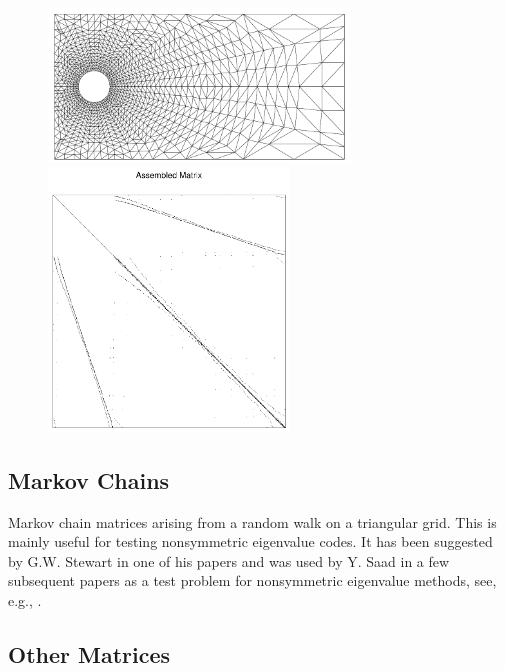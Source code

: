 \documentclass[12pt]{article}
\begin{document}
\newpage

\begin{figure}
\begin{minipage}[h]{6.5cm}
\includegraphics[width=8cm]{msh9} 
\end{minipage}
\hfill
\begin{minipage}[h]{6.5cm}
\includegraphics[height=7cm]{mat9}
\end{minipage}
\hfill
\end{figure}

\vskip 2.5in
\subsection{Markov Chains}

Markov chain matrices arising from a random walk on a
triangular grid. This is mainly useful for testing nonsymmetric 
eigenvalue codes. It has been suggested by G.W. Stewart in one of his
papers \cite{Stewart-SRRIT} and was used by Y. Saad in a few
subsequent papers as a test problem for nonsymmetric eigenvalue methods,
see,  e.g., \cite{Saad-cheb}. 

\subsection{Other Matrices}
\end{document}
